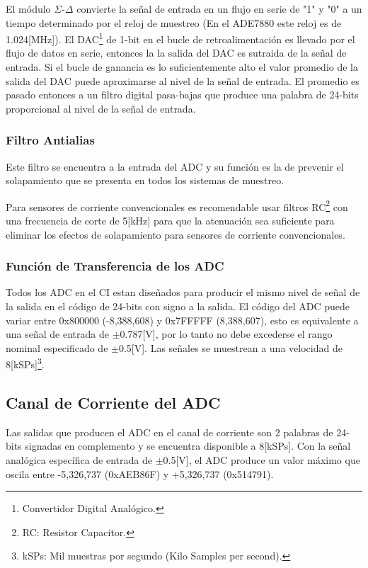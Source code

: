 \documentclass[letterpaper,12pt,oneside]{book}
\begin{document}
				El módulo $\Sigma$-$\Delta$ convierte la señal de entrada en un flujo en serie de "1" y "0" a un tiempo determinado por el reloj de muestreo (En el ADE7880 este reloj es de 1.024[MHz]). El DAC\footnote{Convertidor Digital Analógico.} de 1-bit en el bucle de retroalimentación es llevado por el flujo de datos en serie, entonces la la salida del DAC es sutraida de la señal de entrada. Si el bucle de ganancia es lo suficientemente alto el valor promedio de la salida del DAC puede aproximarse al nivel de la señal de entrada. El promedio es pasado entonces a un filtro digital pasa-bajas que produce una palabra de 24-bits proporcional al nivel de la señal de entrada.

				\subsubsection{Filtro Antialias}
				Este filtro se encuentra a la entrada del ADC y su función es la de prevenir el solapamiento que se presenta en todos los sistemas de muestreo.

				Para sensores de corriente convencionales es recomendable usar filtros RC\footnote{RC: Resistor Capacitor.} con una frecuencia de corte de 5[kHz] para que la atenuación sea suficiente para eliminar los efectos de solapamiento para sensores de corriente convencionales.

				\subsubsection{Función de Transferencia de los ADC}
				Todos los ADC en el CI estan diseñados para producir el mismo nivel de señal de la salida en el código de 24-bits con signo a la salida. El código del ADC puede variar entre 0x800000 (-8,388,608) y 0x7FFFFF (8,388,607), esto es equivalente a una señal de entrada de $\pm$0.787[V], por lo tanto no debe excederse el rango nominal especificado de $\pm$0.5[V]. Las señales se muestrean a una velocidad de 8[kSPs]\footnote{kSPs: Mil muestras por segundo (Kilo Samples per second).}.

			\subsection{Canal de Corriente del ADC}
			Las salidas que producen el ADC en el canal de corriente son 2 palabras de 24-bits signadas en complemento y se encuentra disponible a 8[kSPs]. Con la señal analógica específica de entrada de $\pm$0.5[V], el ADC produce un valor máximo que oscila entre -5,326,737 (0xAEB86F) y +5,326,737 (0x514791).
\end{document}
